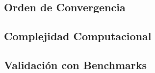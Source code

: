 \documentclass[a4paper,10pt,twocolumn]{article}
\begin{document}
\subsection{Orden de Convergencia}\label{subsec:convergencia}



\subsection{Complejidad Computacional}\label{subsec:complejidad}



\subsection{Validación con Benchmarks}\label{subsec:validacion}



\end{document}

